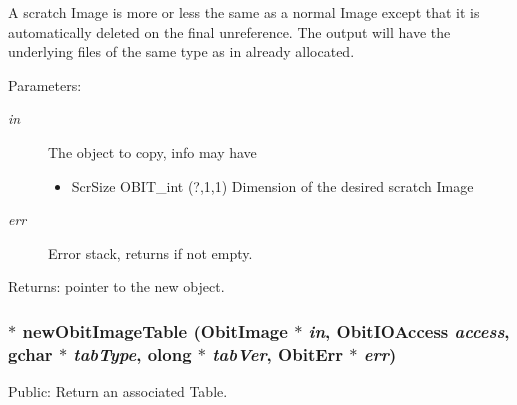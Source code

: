 A scratch Image is more or less the same as a normal Image except that it is automatically deleted on the final unreference. The output will have the underlying files of the same type as in already allocated. \begin{Desc}
\item[Parameters:]
\begin{description}
\item[{\em in}]The object to copy, info may have \begin{itemize}
\item Scr\-Size OBIT\_\-int (?,1,1) Dimension of the desired scratch Image \end{itemize}
\item[{\em err}]Error stack, returns if not empty. \end{description}
\end{Desc}
\begin{Desc}
\item[Returns:]pointer to the new object. \end{Desc}
\subsubsection{$\ast$ new\-Obit\-Image\-Table ({\bf Obit\-Image} $\ast$ {\em in}, Obit\-IOAccess {\em access}, gchar $\ast$ {\em tab\-Type}, {\bf olong} $\ast$ {\em tab\-Ver}, {\bf Obit\-Err} $\ast$ {\em err})}\label{ObitImage_8c_a27}


Public: Return an associated Table. 

